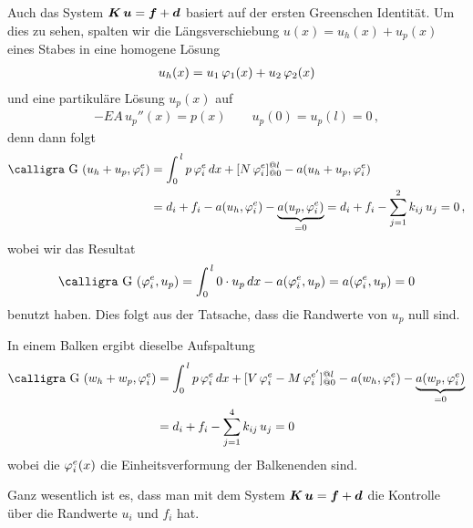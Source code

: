 {{{{Auch das System $\mbox{\boldmath $K$}\,\mbox{\boldmath $u$} = \mbox{\boldmath $f$} + \mbox{\boldmath $d$}$ basiert auf der ersten Greenschen Identit\"{a}t. Um dies zu sehen, spalten wir die L\"{a}ngsverschiebung $u(x) = u_h(x) + u_p(x)$ eines Stabes in eine homogene L\"{o}sung
\begin{align}
u_h(x) = u_1\,\varphi_1(x) + u_2\,\varphi_2(x)
\end{align}
und eine partikul\"{a}re L\"{o}sung $u_p(x)$ auf
\begin{align}
- EA\,u_p''(x) = p(x) \qquad u_p(0) = u_p(l) = 0\,,
\end{align}
denn dann folgt
\begin{align}
\text{\normalfont\calligra G\,\,}(u_h + u_p,\Np_i^e) &= \int_0^{\,l} p\,\Np_i^e \,dx + [N\,\Np_i^e]_{@0}^{@l} - a(u_h + u_p,\Np_i^e) \nn \\
&= d_i + f_i - a(u_h,\Np_i^e) - \underbrace{a(u_p,\Np_i^e)}_{ = 0} = d_i + f_i - \sum_{j = 1}^2 k_{ij}\,u_j = 0\,,
\end{align}
wobei wir das Resultat
\begin{align}
\text{\normalfont\calligra G\,\,}(\Np_i^e,u_p) = \int_0^{\,l} 0 \cdot u_p\,dx - a(\Np_i^e, u_p) = a(\Np_i^e, u_p) = 0
\end{align}
benutzt haben. Dies folgt aus der Tatsache, dass die Randwerte von $u_p$ null sind.

In einem Balken ergibt dieselbe Aufspaltung
\begin{align}\label{Eq159}
\text{\normalfont\calligra G\,\,}(w_h + w_p,\Np_i^e) &= \int_0^{\,l} p\,\Np_i^e\,dx + [V\,\Np_i^e - M\,\Np_i^{e'}]_{@0}^{@l} - a(w_h,\Np_i^e) -  \underbrace{a(w_p,\Np_i^e)}_{ = 0}  \nn \\
&= d_i + f_i - \sum_{j = 1}^4 k_{ij}\,u_j = 0
\end{align}
wobei die $\varphi_i^e(x)$ die Einheitsverformung der Balkenenden sind.

Ganz wesentlich ist es, dass man mit dem System $\mbox{\boldmath $K$}\,\mbox{\boldmath $u$} = \mbox{\boldmath $f$} + \mbox{\boldmath $d$}$ die Kontrolle \"{u}ber die Randwerte $u_i$ und $f_i$ hat.\\

}}}}
